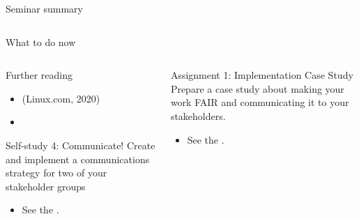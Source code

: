 \begin{frame}{Seminar summary}
\begin{columns}[c]
\begin{column}{.45\textwidth}
		\end{column}
		
	\end{columns}

\end{frame}


\begin{frame}{What to do now}

	\begin{columns}[t]
		\begin{column}{.45\textwidth}
		
		\begin{block}{Further reading}
		\begin{itemize}
		    \item {} (Linux.com, 2020)
		    \item {}
		\end{itemize}
		\end{block}
		
		\begin{block}{Self-study 4: Communicate!}
			Create and implement a communications strategy for two of your stakeholder groups
			\begin{itemize}
			    \item See the .
			\end{itemize}
		\end{block}
		\end{column}

		\begin{column}{.45\textwidth}
		
		\begin{block}{Assignment 1: Implementation Case Study}
			Prepare a case study about making your work FAIR and communicating it to your stakeholders.
			\begin{itemize}
			    \item See the .
			\end{itemize}
		\end{block}
		

\end{column}
\end{columns}
\end{frame}
